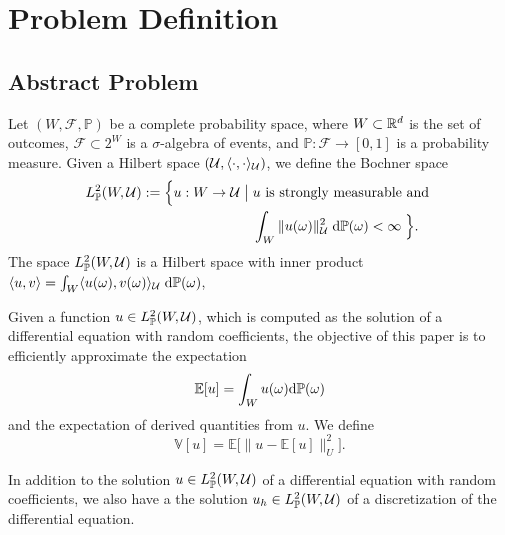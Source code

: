 
\section{Problem Definition}\label{sec:problem}

\subsection{Abstract Problem} \label{sec:abstract_problem}
Let $(W, \mathcal{F}, \mathbb{P})$ be a complete probability space, where
$W \subset \mathbb{R}^d$ is the set of outcomes, $\mathcal{F} \subset 2^{W}$ is a
$\sigma$-algebra of events, and $\mathbb{P}: \mathcal{F} \to [0,1]$ is a
probability measure. Given a Hilbert space $(\mathcal{U}, \langle \cdot, \cdot \rangle_{\mathcal{U}})$, we define the Bochner space
\begin{align*}
  L_{\mathbb{P}}^2(W, \mathcal{U}) := \Big\{ u: W \rightarrow \mathcal{U} \;\big|\; & u \mbox{ is strongly measurable and } \\
                                                                 & \int_W \| u(\omega) \|_{\mathcal{U}}^2 \; \textup{d}\mathbb{P}(\omega) < \infty \; \Big\}.
\end{align*}
The space $ L_{\mathbb{P}}^2(W, \mathcal{U})$ is a Hilbert space with inner product $ \langle u, v \rangle =  \int_W  \langle  u(\omega) , v(\omega)  \rangle_{\mathcal{U}} \; \textup{d}\mathbb{P}(\omega)$,

Given a function $u \in   L_{\mathbb{P}}^2(W, \mathcal{U})$, which is computed as the solution of a differential equation with random coefficients,
the objective of this paper is to  efficiently approximate the expectation
 \begin{equation}   \label{eq:expectation_of_u}
      \mathbb{E}[ u ] = \int_W u(\omega)  \textup{d}\mathbb{P}(\omega)
 \end{equation}
 and the expectation of derived quantities from $u$. We define
\[
           \mathbb{V}[u] = \mathbb{E}\big[  \| u - \mathbb{E}[u]  \|_U^2 \big].
 \]

In addition to the solution  $u \in   L_{\mathbb{P}}^2(W, \mathcal{U})$ of a differential equation with random coefficients, we also have a 
the solution $u_h \in   L_{\mathbb{P}}^2(W, \mathcal{U})$ of a discretization of the differential equation.


